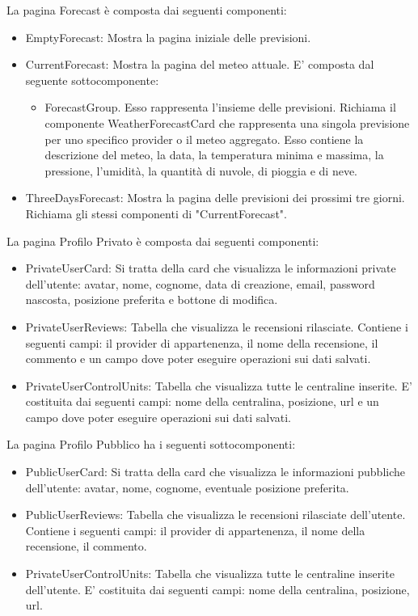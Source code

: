 La pagina Forecast è composta dai seguenti componenti:
\begin{itemize}
    \item EmptyForecast: Mostra la pagina iniziale delle previsioni.
    \item CurrentForecast: Mostra la pagina del meteo attuale. E' composta dal seguente sottocomponente: 
    \begin{itemize}
    \item ForecastGroup. Esso rappresenta l'insieme delle previsioni. Richiama il componente WeatherForecastCard che rappresenta una singola previsione per uno specifico provider o il meteo aggregato. Esso contiene la descrizione del meteo, la data, la temperatura minima e massima, la pressione, l'umidità, la quantità di nuvole, di pioggia e di neve. 
    \end{itemize}
    \item ThreeDaysForecast: Mostra la pagina delle previsioni dei prossimi tre giorni. Richiama gli stessi componenti di "CurrentForecast".
\end{itemize}
La pagina Profilo Privato è composta dai seguenti componenti:
\begin{itemize}
    \item PrivateUserCard: Si tratta della card che visualizza le informazioni private dell'utente: avatar, nome, cognome, data di creazione, email, password nascosta, posizione preferita e bottone di modifica.
    \item PrivateUserReviews: Tabella che visualizza le recensioni rilasciate. Contiene i seguenti campi: il provider di appartenenza, il nome della recensione, il commento e un campo dove poter eseguire operazioni sui dati salvati. 
    \item PrivateUserControlUnits: Tabella che visualizza tutte le centraline inserite. E' costituita dai seguenti campi: nome della centralina, posizione, url e un campo dove poter eseguire operazioni sui dati salvati. 

\end{itemize}
La pagina Profilo Pubblico ha i seguenti sottocomponenti:
\begin{itemize}
    \item PublicUserCard: Si tratta della card che visualizza le informazioni pubbliche dell'utente: avatar, nome, cognome, eventuale posizione preferita.
    \item PublicUserReviews: Tabella che visualizza le recensioni rilasciate dell'utente. Contiene i seguenti campi: il provider di appartenenza, il nome della recensione, il commento. 
    \item PrivateUserControlUnits: Tabella che visualizza tutte le centraline inserite dell'utente. E' costituita dai seguenti campi: nome della centralina, posizione, url. 

\end{itemize}
